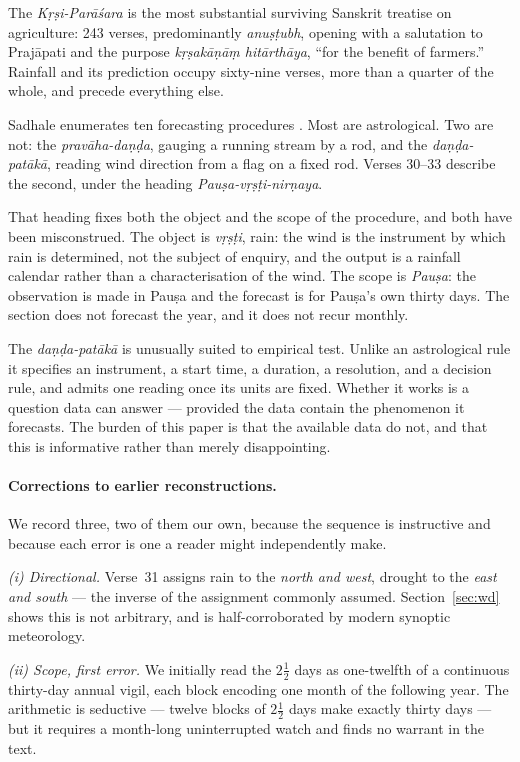 \documentclass[11pt,a4paper]{article}
\newcommand{\skt}[1]{\textcolor{skt}{\textit{#1}}}
\begin{document}
The \skt{Kṛṣi-Parāśara} is the most substantial surviving Sanskrit treatise on agriculture: 243 verses, predominantly \skt{anuṣṭubh}, opening with a salutation to Prajāpati and the purpose \skt{kṛṣakāṇāṃ hitārthāya}, ``for the benefit of farmers.'' Rainfall and its prediction occupy sixty-nine verses, more than a quarter of the whole, and precede everything else.

Sadhale enumerates ten forecasting procedures \cite{sadhale}. Most are astrological. Two are not: the \skt{pravāha-daṇḍa}, gauging a running stream by a rod, and the \skt{daṇḍa-patākā}, reading wind direction from a flag on a fixed rod. Verses 30--33 describe the second, under the heading \skt{Pauṣa-vṛṣṭi-nirṇaya}.

That heading fixes both the object and the scope of the procedure, and both have been misconstrued. The object is \skt{vṛṣṭi}, rain: the wind is the instrument by which rain is determined, not the subject of enquiry, and the output is a rainfall calendar rather than a characterisation of the wind. The scope is \emph{Pauṣa}: the observation is made in Pauṣa and the forecast is for Pauṣa's own thirty days. The section does not forecast the year, and it does not recur monthly.

The \skt{daṇḍa-patākā} is unusually suited to empirical test. Unlike an astrological rule it specifies an instrument, a start time, a duration, a resolution, and a decision rule, and admits one reading once its units are fixed. Whether it works is a question data can answer --- provided the data contain the phenomenon it forecasts. The burden of this paper is that the available data do not, and that this is informative rather than merely disappointing.

\paragraph{Corrections to earlier reconstructions.}
We record three, two of them our own, because the sequence is instructive and because each error is one a reader might independently make.

\emph{(i) Directional.} Verse~31 assigns rain to the \emph{north and west}, drought to the \emph{east and south} --- the inverse of the assignment commonly assumed. Section~\ref{sec:wd} shows this is not arbitrary, and is half-corroborated by modern synoptic meteorology.

\emph{(ii) Scope, first error.} We initially read the $2\tfrac{1}{2}$ days as one-twelfth of a continuous thirty-day annual vigil, each block encoding one month of the following year. The arithmetic is seductive --- twelve blocks of $2\tfrac{1}{2}$ days make exactly thirty days --- but it requires a month-long uninterrupted watch and finds no warrant in the text.
\end{document}
